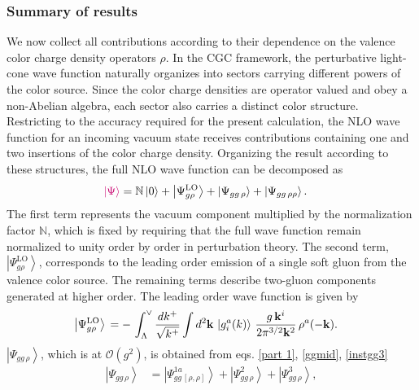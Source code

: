 \documentclass[a4paper,11pt]{article}
\def\mf#1{\mathbb{#1}}
\begin{document}
\subsubsection{Summary of results}
We now collect all contributions according to their dependence on the valence color charge density operators $\rho$. In the CGC framework, the perturbative light-cone wave function naturally organizes into sectors carrying different powers of the color source. Since the color charge densities are operator valued and obey a non-Abelian algebra, each sector also carries a distinct color structure. Restricting to the accuracy required for the present calculation, the NLO wave function for an incoming vacuum state receives contributions containing one and two insertions of the color charge density. Organizing the result according to these structures, the full NLO wave function can be decomposed as
\begin{align}\label{NLOWF}
{\color{chg}\left|\Psi\right\rangle} & = \mf{N}\left|0\right\rangle +\left|\Psi_{g\rho}^{\text{LO}}\right\rangle  
+\left|\Psi_{gg\,\rho}\right\rangle +\left|\Psi_{gg\,\rho\rho}\right\rangle.
\end{align}
The first term represents the vacuum component multiplied by the normalization factor $\mf{N}$, which is fixed by requiring that the full wave function remain normalized to unity order by order in perturbation theory. The second term, $\left|\Psi_{g\rho}^{\text{LO}}\right\rangle $, corresponds to the leading order emission of a single soft gluon from the valence color source. The remaining terms describe two-gluon components generated at higher order. The leading order wave function is given by
\begin{align}\label{lowav1mom}
\left|\Psi_{g\rho}^{\text{LO}}\right\rangle \,& =\- -\,\int_{\Lambda}^{\vee}\frac{dk^{+}}{\sqrt{k^{+}}}\int d^{2}\mathbf{k}\,\left|g_{i}^{a}(k)\right\rangle\,\frac{g\, \mathbf{k}^{i}}{2\pi^{3/2}\mathbf{k}^{2}}\,\rho^{a}(-\mathbf{k}).
\end{align}
$\left|\Psi_{gg\,\rho}\right\rangle$, which is at $\mathcal{O}(g^{2})$, is obtained from eqs. \eqref{part 1}, \eqref{ggmid}, \eqref{instgg3}
\begin{align}
    \left|\Psi_{gg\,\rho}\right\rangle  & = \left|\Psi^{1a}_{gg\,[\rho,\rho]}\right\rangle + \left|\Psi^{2}_{gg\,\rho}\right\rangle + \left|\Psi^{3}_{gg\,\rho}\right\rangle,
\end{align}
\end{document}
